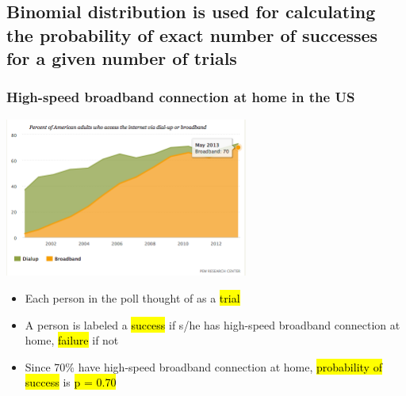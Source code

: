\documentclass[slidestop,compress,mathserif,10pt,t,professionalfonts,xcolor=table]{beamer}
\begin{document}

\subsection{Binomial distribution is used for calculating the probability of exact number of 
successes for a given number of trials}
\label{mi4}


\begin{frame}
\frametitle{High-speed broadband connection at home in the US}

\begin{center}
\includegraphics[width=0.6\textwidth]{figures/pew_internet_access}
\end{center}

\pause

\begin{itemize}
\item Each person in the poll thought of as a \hl{trial}
\pause
\item A person is labeled a \hl{success} if s/he has high-speed broadband connection at home, \hl{failure} if not
\pause
\item Since 70\% have high-speed broadband connection at home, \hl{probability of success} is \hl{p = 0.70}
\end{itemize}

\end{frame}

\end{document}
